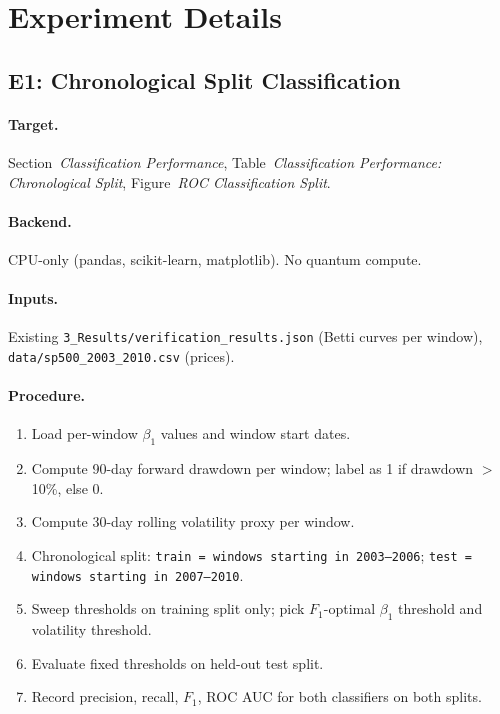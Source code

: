 \documentclass[11pt]{article}
\begin{document}
\section{Experiment Details}

\subsection{E1: Chronological Split Classification}

\paragraph*{Target.} Section~\emph{Classification Performance},
Table~\emph{Classification Performance: Chronological Split},
Figure~\emph{ROC Classification Split}.

\paragraph*{Backend.} CPU-only (pandas, scikit-learn,
matplotlib). No quantum compute.

\paragraph*{Inputs.} Existing
\texttt{3\_Results/verification\_results.json} (Betti curves per
window), \texttt{data/sp500\_2003\_2010.csv} (prices).

\paragraph*{Procedure.}
\begin{enumerate}[leftmargin=*]
  \item Load per-window $\beta_1$ values and window start dates.
  \item Compute 90-day forward drawdown per window; label as 1 if
        drawdown $>$ 10\%, else 0.
  \item Compute 30-day rolling volatility proxy per window.
  \item Chronological split: \texttt{train = windows starting in
        2003--2006}; \texttt{test = windows starting in 2007--2010}.
  \item Sweep thresholds on training split only; pick $F_1$-optimal
        $\beta_1$ threshold and volatility threshold.
  \item Evaluate fixed thresholds on held-out test split.
  \item Record precision, recall, $F_1$, ROC AUC for both classifiers
        on both splits.
\end{enumerate}
\end{document}

